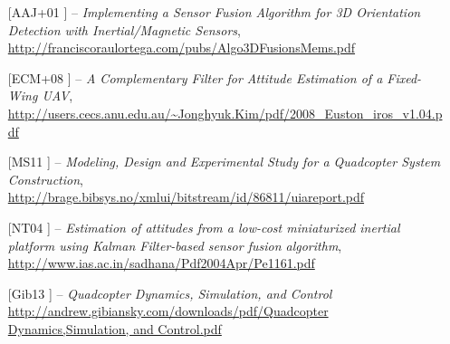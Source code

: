 \documentclass[12pt, a4paper, lithuanian, final]{article}
\begin{document}

\begin{itemize}%
	\item [[AAJ+01]] -- \textit{Implementing a Sensor Fusion Algorithm for 3D Orientation Detection with Inertial/Magnetic Sensors}, \url{http://franciscoraulortega.com/pubs/Algo3DFusionsMems.pdf}
	\item [[ECM+08]] -- \textit{A Complementary Filter for Attitude Estimation of a Fixed-Wing UAV}, \url{http://users.cecs.anu.edu.au/~Jonghyuk.Kim/pdf/2008_Euston_iros_v1.04.pdf}
	\item [[MS11]] -- \textit{Modeling, Design and Experimental Study for a Quadcopter System Construction}, \url{http://brage.bibsys.no/xmlui/bitstream/id/86811/uiareport.pdf}
	\item [[NT04]] -- \textit{Estimation of attitudes from a low-cost miniaturized inertial platform using Kalman Filter-based sensor fusion algorithm}, \url{http://www.ias.ac.in/sadhana/Pdf2004Apr/Pe1161.pdf}
	\item [[Gib13]] -- \textit{Quadcopter Dynamics, Simulation, and Control} \url{http://andrew.gibiansky.com/downloads/pdf/Quadcopter Dynamics,Simulation, and Control.pdf}
\end{itemize}
\end{document}
